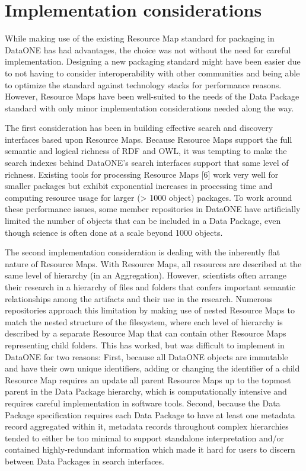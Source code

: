 \documentclass[conference]{IEEEtran}
\begin{document}
\section{Implementation considerations}

While making use of the existing Resource Map standard for packaging in DataONE has had advantages, the choice was not without the need for careful implementation.
Designing a new packaging standard might have been easier due to not having to consider interoperability with other communities and being able to optimize the standard against technology stacks for performance reasons.
However, Resource Maps have been well-suited to the needs of the Data Package standard with only minor implementation considerations needed along the way.

The first consideration has been in building effective search and discovery interfaces based upon Resource Maps.
Because Resource Maps support the full semantic and logical richness of RDF and OWL, it was tempting to make the search indexes behind DataONE’s search interfaces support that same level of richness.
Existing tools for processing Resource Maps [6] work very well for smaller packages but exhibit exponential increases in processing time and computing resource usage for larger (> 1000 object) packages.
To work around these performance issues, some member repositories in DataONE have artificially limited the number of objects that can be included in a Data Package, even though science is often done at a scale beyond 1000 objects.

The second implementation consideration is dealing with the inherently flat nature of Resource Maps.
With Resource Maps, all resources are described at the same level of hierarchy (in an Aggregation).
However, scientists often arrange their research in a hierarchy of files and folders that confers important semantic relationships among the artifacts and their use in the research.
Numerous repositories approach this limitation by making use of nested Resource Maps to match the nested structure of the filesystem, where each level of hierarchy is described by a separate Resource Map that can contain other Resource Maps representing child folders.
This has worked, but was difficult to implement in DataONE for two reasons:
First, because all DataONE objects are immutable and have their own unique identifiers, adding or changing the identifier of a child Resource Map requires an update all parent Resource Maps up to the topmost parent in the Data Package hierarchy, which is computationally intensive and requires careful implementation in software tools.
Second, because the Data Package specification requires each Data Package to have at least one metadata record aggregated within it, metadata records throughout complex hierarchies tended to either be too minimal to support standalone interpretation and/or contained highly-redundant information which made it hard for users to discern between Data Packages in search interfaces.
\end{document}
